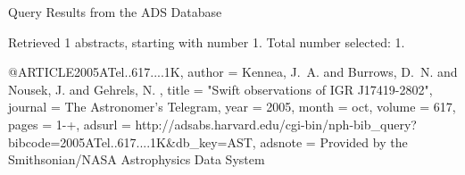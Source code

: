 Query Results from the ADS Database


Retrieved 1 abstracts, starting with number 1.  Total number selected: 1.

@ARTICLE{2005ATel..617....1K,
   author = {{Kennea}, J.~A. and {Burrows}, D.~N. and {Nousek}, J. and {Gehrels}, N.
	},
    title = "{Swift observations of IGR J17419-2802}",
  journal = {The Astronomer's Telegram},
     year = 2005,
    month = oct,
   volume = 617,
    pages = {1-+},
   adsurl = {http://adsabs.harvard.edu/cgi-bin/nph-bib_query?bibcode=2005ATel..617....1K&db_key=AST},
  adsnote = {Provided by the Smithsonian/NASA Astrophysics Data System}
}


